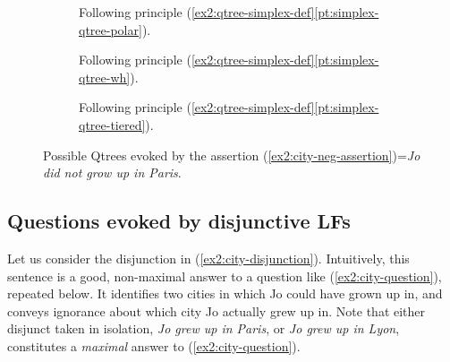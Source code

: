 \begin{figure}[H]
	\centering
	\begin{subfigure}[t]{.23\linewidth}
		\centering
		\caption{Following principle (\ref{ex2:qtree-simplex-def}\ref{pt:simplex-qtree-polar}).}\label{fig2:neg-city-qtree-polar}
	\end{subfigure}
	\hfill
	\begin{subfigure}[t]{.33\linewidth}
		\centering		{}
		\caption{Following principle (\ref{ex2:qtree-simplex-def}\ref{pt:simplex-qtree-wh}).}\label{fig2:neg-city-qtree-wh}
	\end{subfigure}
	\hfill
	\begin{subfigure}[t]{.38\linewidth}
		\centering{}
		\caption{Following principle (\ref{ex2:qtree-simplex-def}\ref{pt:simplex-qtree-tiered}).}\label{fig2:neg-city-qtree-tiered}
	\end{subfigure}
	\caption{Possible Qtrees evoked by the assertion (\ref{ex2:city-neg-assertion})=\textit{Jo did not grow up in Paris}.}\label{fig2:neg-city-qtrees}
\end{figure}


\subsection{Questions evoked by disjunctive LFs}\label{sec:disjunctive-qtrees}

Let us consider the disjunction in (\ref{ex2:city-disjunction}). Intuitively, this sentence is a good, non-maximal answer to a question like (\ref{ex2:city-question}), repeated below. It identifies two cities in which Jo could have grown up in, and conveys ignorance about which city Jo actually grew up in. Note that either disjunct taken in isolation, \textit{Jo grew up in Paris}, or \textit{Jo grew up in Lyon}, constitutes a \textit{maximal} answer to (\ref{ex2:city-question}).

